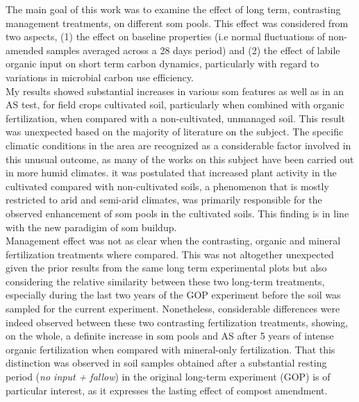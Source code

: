 

The  main goal of this work was to examine the effect of long term, contrasting management treatments, on different \gls{som} pools. This effect was considered from two aspects, (1) the effect on baseline properties (i.e normal fluctuations of non-amended samples averaged across a 28 days period) and (2) the effect of labile organic input on short term  carbon dynamics, particularly with regard to variations in microbial carbon use efficiency.\\
My results showed substantial increases in various \gls{som} features as well as in an AS test, for field crops cultivated soil, particularly when combined with organic fertilization, when compared with a non-cultivated, unmanaged soil. This result was unexpected based on the majority of literature on the subject. The specific climatic conditions in the area are recognized as a considerable factor involved in this unusual outcome, as many of the works on this subject have been carried out in more humid climates. it was postulated that increased plant activity in the cultivated compared with non-cultivated soils, a phenomenon that is mostly restricted to arid and semi-arid climates, was primarily responsible for the observed enhancement of \gls{som} pools in the cultivated soils. This finding is in line with the new paradigim of \gls{som} buildup. \\
Management effect was not as clear when the contrasting, organic and mineral fertilization treatments where compared. This was not altogether unexpected given the prior results from the same long term experimental plots but also considering the relative similarity between these two long-term treatments, especially during the last two years of the GOP experiment before the soil was sampled for the current experiment. Nonetheless, considerable differences were indeed observed between these two contrasting fertilization treatments, showing, on the whole, a definite increase in \gls{som} pools and AS after 5 years of intense organic fertilization when compared with mineral-only fertilization. That this distinction was observed in soil samples obtained after a substantial resting period (\textit{no input + fallow}) in the original long-term experiment (GOP) is of particular interest, as it expresses the lasting effect of compost amendment.\\
